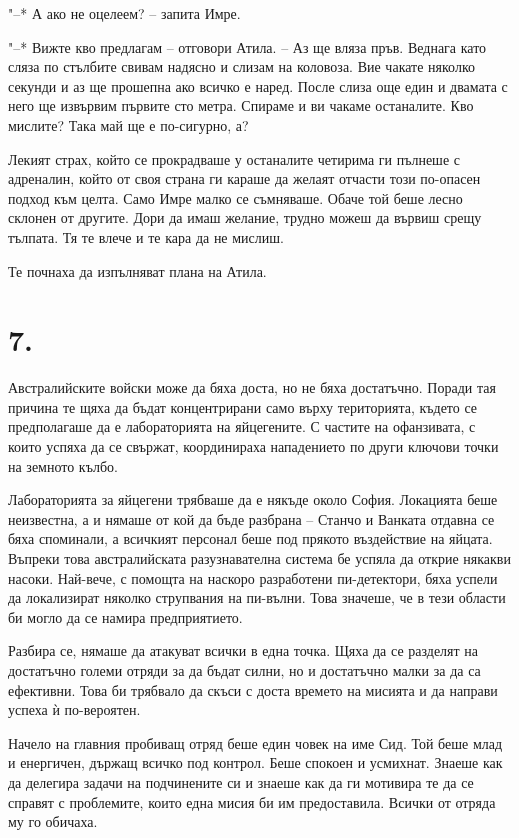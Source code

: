 \documentclass[ebook,openany,12pt]{memoir}
\begin{document}
"--* А ако не оцелеем? – запита Имре.

"--* Вижте кво предлагам – отговори Атила. – Аз ще вляза пръв. Веднага като сляза по стълбите свивам надясно и слизам на коловоза. Вие чакате няколко секунди и аз ще прошепна ако всичко е наред. После слиза още един и двамата с него ще извървим първите сто метра. Спираме и ви чакаме останалите. Кво мислите? Така май ще е по-сигурно, а?

Лекият страх, който се прокрадваше у останалите четирима ги пълнеше с адреналин, който от своя страна ги караше да желаят отчасти този по-опасен подход към целта. Само Имре малко се съмняваше. Обаче той беше лесно склонен от другите. Дори да имаш желание, трудно можеш да вървиш срещу тълпата. Тя те влече и те кара да не мислиш.

Те почнаха да изпълняват плана на Атила.

\section*{7.}

Австралийските войски може да бяха доста, но не бяха достатъчно. Поради тая причина те щяха да бъдат концентрирани само върху територията, където се предполагаше да е лабораторията на яйцегените. С частите на офанзивата, с които успяха да се свържат, координираха нападението по други ключови точки на земното кълбо.

Лабораторията за яйцегени трябваше да е някъде около София. Локацията беше неизвестна, а и нямаше от кой да бъде разбрана – Станчо и Ванката отдавна се бяха споминали, а всичкият персонал беше под прякото въздействие на яйцата. Въпреки това австралийската разузнавателна система бе успяла да открие някакви насоки. Най-вече, с помощта на наскоро разработени пи-детектори, бяха успели да локализират няколко струпвания на пи-вълни. Това значеше, че в тези области би могло да се намира предприятието. 

Разбира се, нямаше да атакуват всички в една точка. Щяха да се разделят на достатъчно големи отряди за да бъдат силни, но и достатъчно малки за да са ефективни. Това би трябвало да скъси с доста времето на мисията и да направи успеха ѝ по-вероятен.

Начело на главния пробиващ отряд беше един човек на име Сид. Той беше млад и енергичен, държащ всичко под контрол. Беше спокоен и усмихнат. Знаеше как да делегира задачи на подчинените си и знаеше как да ги мотивира те да се справят с проблемите, които една мисия би им предоставила. Всички от отряда му го обичаха.
\end{document}
